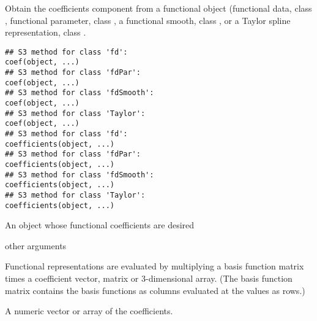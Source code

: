 \documentclass{article}
\begin{document}
\begin{Description}\relax
Obtain the coefficients component from a functional object (functional
data, class , functional parameter, class , a
functional smooth, class , or a Taylor spline
representation, class .
\end{Description}
\begin{Usage}
\begin{verbatim}
## S3 method for class 'fd':
coef(object, ...)
## S3 method for class 'fdPar':
coef(object, ...)
## S3 method for class 'fdSmooth':
coef(object, ...)
## S3 method for class 'Taylor':
coef(object, ...)
## S3 method for class 'fd':
coefficients(object, ...)
## S3 method for class 'fdPar':
coefficients(object, ...)
## S3 method for class 'fdSmooth':
coefficients(object, ...)
## S3 method for class 'Taylor':
coefficients(object, ...)
\end{verbatim}
\end{Usage}
\begin{Arguments}
\begin{ldescription}
\item[\code{object}] An object whose functional coefficients are desired 

\item[\code{... }] other arguments 

\end{ldescription}
\end{Arguments}
\begin{Details}\relax
Functional representations are evaluated by multiplying a basis
function matrix times a coefficient vector, matrix or 3-dimensional
array. (The basis function matrix contains the basis functions as
columns evaluated at the  values as rows.)
\end{Details}
\begin{Value}
A numeric vector or array of the coefficients.
\end{Value}
\begin{SeeAlso}\relax
{}
\end{SeeAlso}
\end{document}
